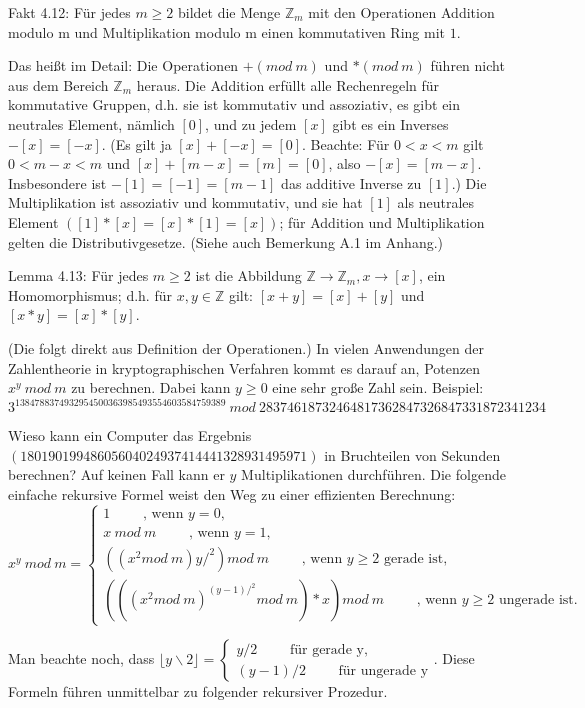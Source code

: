 \documentclass[a4paper]{article}
\begin{document}
\begin{multicols}{3}
Fakt 4.12: Für jedes $m\geq 2$ bildet die Menge $\mathbb{Z}_m$ mit den Operationen Addition modulo m und Multiplikation modulo m einen kommutativen Ring mit $1$.

Das heißt im Detail: Die Operationen $+(mod\ m)$ und $*(mod\ m)$ führen nicht aus dem Bereich $\mathbb{Z}_m$ heraus. Die Addition erfüllt alle Rechenregeln für kommutative Gruppen, d.h. sie ist kommutativ und assoziativ, es gibt ein neutrales Element, nämlich $[0]$, und zu jedem $[x]$ gibt es ein Inverses $-[x]=[-x]$. (Es gilt ja $[x] + [-x] = [0]$. Beachte: Für $0 < x < m$ gilt $0< m-x < m$ und $[x]+[m-x]=[m]=[0]$, also $-[x]=[m-x]$. Insbesondere ist $-[1]=[-1]=[m-1]$ das additive Inverse zu $[1]$.) Die Multiplikation ist assoziativ und kommutativ, und sie hat $[1]$ als neutrales Element $([1]*[x] = [x]*[1] = [x])$; für Addition und Multiplikation gelten die Distributivgesetze. (Siehe auch Bemerkung A.1 im Anhang.)

Lemma 4.13: Für jedes $m\geq 2$ ist die Abbildung $\mathbb{Z}\rightarrow\mathbb{Z}_m ,x\rightarrow [x]$, ein Homomorphismus; d.h. für $x,y\in\mathbb{Z}$ gilt: $[x+y]=[x]+[y]$ und $[x*y] = [x]*[y]$. 

(Die folgt direkt aus Definition der Operationen.) 
In vielen Anwendungen der Zahlentheorie in kryptographischen Verfahren kommt es darauf an, Potenzen $x^y\ mod\ m$ zu berechnen. Dabei kann $y\geq 0$ eine sehr große Zahl sein. Beispiel: $3^{1384788374932954500363985493554603584759389}\ mod\ 28374618732464817362847326847331872341234$

Wieso kann ein Computer das Ergebnis $(18019019948605604024937414441328931495971)$ in Bruchteilen von Sekunden berechnen? Auf keinen Fall kann er $y$ Multiplikationen durchführen. Die folgende einfache rekursive Formel weist den Weg zu einer effizienten Berechnung:
$$x^y\ mod\ m=\begin{cases} 1\quad\quad\text{ , wenn } y=0,\\ x\ mod\ m\quad\quad\text{ , wenn } y= 1,\\ ((x^2 mod\ m)y/^2 ) mod\ m\quad\quad\text{ , wenn } y\geq 2 \text{ gerade ist},\\ (((x^2 mod\ m)^{(y-1)/^2} mod\ m)*x) mod\ m\quad\quad\text{ , wenn } y\geq 2 \text{ ungerade ist}.\end{cases}$$

Man beachte noch, dass $\lfloor y\backslash 2\rfloor=\begin{cases} y/2\quad\quad\text{ für gerade y},\\ (y-1)/2\quad\quad\text{ für ungerade y}\end{cases}$. Diese Formeln führen unmittelbar zu folgender rekursiver Prozedur.


\end{multicols}
\end{document}
